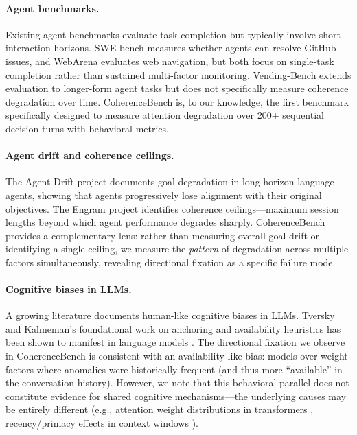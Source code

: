 \documentclass{article}
\begin{document}
\paragraph{Agent benchmarks.}
Existing agent benchmarks evaluate task completion but typically involve
short interaction horizons. SWE-bench \cite{jimenez2024swebench}
measures whether agents can resolve GitHub issues, and WebArena
\cite{zhou2024webarena} evaluates web navigation, but both focus on
single-task completion rather than sustained multi-factor monitoring.
Vending-Bench \cite{vendingbench2025} extends evaluation to longer-form
agent tasks but does not specifically measure coherence degradation over
time. CoherenceBench is, to our knowledge, the first benchmark
specifically designed to measure attention degradation over 200+
sequential decision turns with behavioral metrics.

\paragraph{Agent drift and coherence ceilings.}
The Agent Drift project \cite{agentdrift2025} documents goal degradation
in long-horizon language agents, showing that agents progressively lose
alignment with their original objectives. The Engram project
\cite{engram2026} identifies coherence ceilings---maximum session lengths
beyond which agent performance degrades sharply. CoherenceBench provides
a complementary lens: rather than measuring overall goal drift or
identifying a single ceiling, we measure the \emph{pattern} of
degradation across multiple factors simultaneously, revealing directional
fixation as a specific failure mode.

\paragraph{Cognitive biases in LLMs.}
A growing literature documents human-like cognitive biases in LLMs.
Tversky and Kahneman's foundational work on anchoring and availability
heuristics \cite{tversky1974judgment} has been shown to manifest in
language models \cite{jones2022capturing, hagendorff2023human}. The
directional fixation we observe in CoherenceBench is consistent with an
availability-like bias: models over-weight factors where anomalies were
historically frequent (and thus more ``available'' in the conversation
history). However, we note that this behavioral parallel does not
constitute evidence for shared cognitive mechanisms---the underlying
causes may be entirely different (e.g., attention weight distributions in
transformers \cite{vaswani2017attention}, recency/primacy effects in
context windows \cite{press2022train}).
\end{document}
